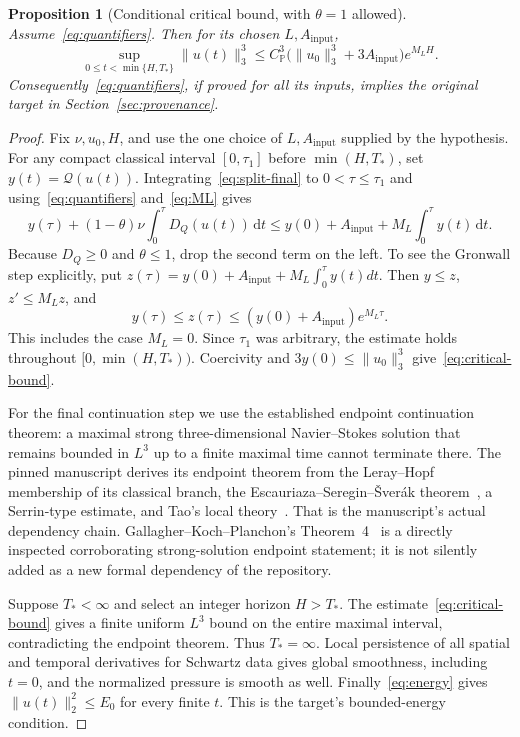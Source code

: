 \documentclass[11pt,a4paper]{article}
\newtheorem{proposition}[theorem]{Proposition}
\theoremstyle{definition}
\newcommand{\Q}{\mathcal Q}
\newcommand{\PP}{\mathbb P}
\newcommand{\dt}{\,\mathrm dt}
\begin{document}
\begin{proposition}[Conditional critical bound, with $\theta=1$ allowed]\label{prop:consumer}
Assume~\eqref{eq:quantifiers}. Then for its chosen $L,A_{\mathrm{input}}$,
\begin{equation}\label{eq:critical-bound}
 \sup_{0\le t<\min\{H,T_*\}}\|u(t)\|_3^3
 \le C_{\PP}^3\bigl(\|u_0\|_3^3+3A_{\mathrm{input}}\bigr)e^{M_LH}.
\end{equation}
Consequently~\eqref{eq:quantifiers}, if proved for all its inputs, implies the original target in Section~\ref{sec:provenance}.
\end{proposition}
\begin{proof}
Fix $\nu,u_0,H$, and use the one choice of $L,A_{\mathrm{input}}$ supplied by the hypothesis. For any compact classical interval $[0,\tau_1]$ before $\min(H,T_*)$, set $y(t)=\Q(u(t))$. Integrating~\eqref{eq:split-final} to $0<\tau\le\tau_1$ and using~\eqref{eq:quantifiers} and~\eqref{eq:ML} gives
\begin{equation}\label{eq:consumer-integral}
 y(\tau)+(1-\theta)\nu\int_0^\tau D_Q(u(t))\dt
 \le y(0)+A_{\mathrm{input}}+M_L\int_0^\tau y(t)\dt.
\end{equation}
Because $D_Q\ge0$ and $\theta\le1$, drop the second term on the left. To see the Gronwall step explicitly, put
$z(\tau)=y(0)+A_{\mathrm{input}}+M_L\int_0^\tau y(t)dt$. Then $y\le z$, $z'\le M_Lz$, and
\[
 y(\tau)\le z(\tau)\le(y(0)+A_{\mathrm{input}})e^{M_L\tau}.
\]
This includes the case $M_L=0$. Since $\tau_1$ was arbitrary, the estimate holds throughout $[0,\min(H,T_*))$. Coercivity and $3y(0)\le\|u_0\|_3^3$ give~\eqref{eq:critical-bound}.

For the final continuation step we use the established endpoint continuation theorem: a maximal strong three-dimensional Navier--Stokes solution that remains bounded in $L^3$ up to a finite maximal time cannot terminate there. The pinned manuscript derives its endpoint theorem from the Leray--Hopf membership of its classical branch, the Escauriaza--Seregin--\v Sver\'ak theorem~\cite{ESS}, a Serrin-type estimate, and Tao's local theory~\cite{Tao}. That is the manuscript's actual dependency chain. Gallagher--Koch--Planchon's Theorem~4~\cite{GKP} is a directly inspected corroborating strong-solution endpoint statement; it is not silently added as a new formal dependency of the repository.

Suppose $T_*<\infty$ and select an integer horizon $H>T_*$. The estimate~\eqref{eq:critical-bound} gives a finite uniform $L^3$ bound on the entire maximal interval, contradicting the endpoint theorem. Thus $T_*=\infty$. Local persistence of all spatial and temporal derivatives for Schwartz data gives global smoothness, including $t=0$, and the normalized pressure is smooth as well. Finally~\eqref{eq:energy} gives $\|u(t)\|_2^2\le E_0$ for every finite $t$. This is the target's bounded-energy condition.
\end{proof}
\end{document}
